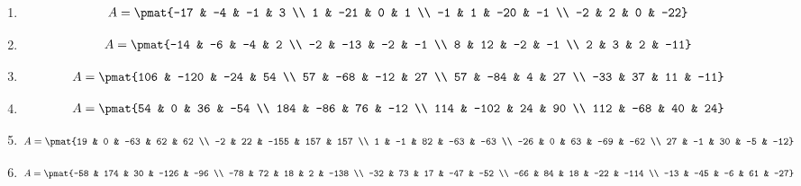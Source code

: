 \begin{enumerate}
\item

\begin{align*}
A = \pmat{-17 & -4 & -1 & 3 \\ 1 & -21 & 0 & 1 \\ -1 & 1 & -20 & -1 \\ -2 & 2 & 0 & -22}
\end{align*}

\item

\begin{align*}
A = \pmat{-14 & -6 & -4 & 2 \\ -2 & -13 & -2 & -1 \\ 8 & 12 & -2 & -1 \\ 2 & 3 & 2 & -11}
\end{align*}

\item

\begin{align*}
A = \pmat{106 & -120 & -24 & 54 \\ 57 & -68 & -12 & 27 \\ 57 & -84 & 4 & 27 \\ -33 & 37 & 11 & -11}
\end{align*}

\item

\begin{align*}
A = \pmat{54 & 0 & 36 & -54 \\ 184 & -86 & 76 & -12 \\ 114 & -102 & 24 & 90 \\ 112 & -68 & 40 & 24}
\end{align*}

\item

\begin{align*}
A = \pmat{19 & 0 & -63 & 62 & 62 \\ -2 & 22 & -155 & 157 & 157 \\ 1 & -1 & 82 & -63 & -63 \\ -26 & 0 & 63 & -69 & -62 \\ 27 & -1 & 30 & -5 & -12}
\end{align*}

\item

\begin{align*}
A = \pmat{-58 & 174 & 30 & -126 & -96 \\ -78 & 72 & 18 & 2 & -138 \\ -32 & 73 & 17 & -47 & -52 \\ -66 & 84 & 18 & -22 & -114 \\ -13 & -45 & -6 & 61 & -27}
\end{align*}


\end{enumerate}
